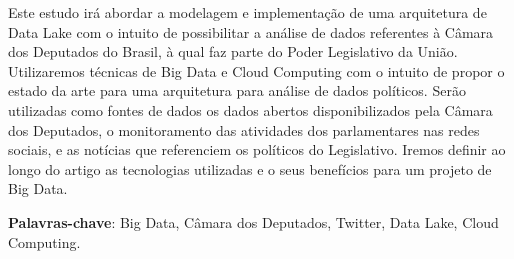 \setlength{\absparsep}{18pt} %
\begin{resumo}
        Este estudo irá abordar a modelagem e implementação de uma arquitetura de Data Lake com o intuito de possibilitar a análise de dados referentes à Câmara dos Deputados do Brasil, à qual faz parte do Poder Legislativo da União. Utilizaremos técnicas de Big Data e Cloud Computing com o intuito de propor o estado da arte para uma arquitetura para análise de dados políticos. Serão utilizadas como fontes de dados os dados abertos disponibilizados pela Câmara dos Deputados, o monitoramento das atividades dos parlamentares nas redes sociais, e as notícias que referenciem os políticos do Legislativo. Iremos definir ao longo do artigo as tecnologias utilizadas e o seus benefícios para um projeto de Big Data.
        
    
    \textbf{Palavras-chave}: Big Data, Câmara dos Deputados, Twitter, Data Lake, Cloud Computing.
\end{resumo}

